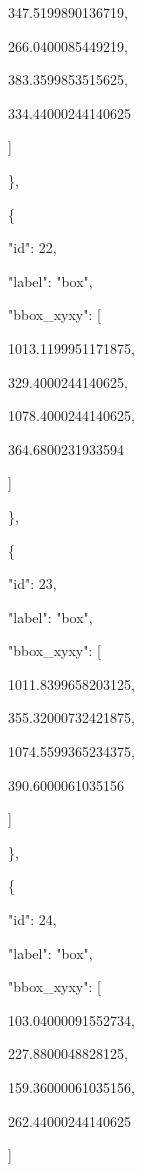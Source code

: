 \documentclass[10pt,a4paper]{article}
\begin{document}
        347.5199890136719,\allowbreak{}\par
        266.0400085449219,\allowbreak{}\par
        383.3599853515625,\allowbreak{}\par
        334.44000244140625\par
      ]\par
    \},\allowbreak{}\par
    \{\par
      "id":\allowbreak{} 22,\allowbreak{}\par
      "label":\allowbreak{} "box",\allowbreak{}\par
      "bbox\_xyxy":\allowbreak{} [\par
        1013.1199951171875,\allowbreak{}\par
        329.4000244140625,\allowbreak{}\par
        1078.4000244140625,\allowbreak{}\par
        364.6800231933594\par
      ]\par
    \},\allowbreak{}\par
    \{\par
      "id":\allowbreak{} 23,\allowbreak{}\par
      "label":\allowbreak{} "box",\allowbreak{}\par
      "bbox\_xyxy":\allowbreak{} [\par
        1011.8399658203125,\allowbreak{}\par
        355.32000732421875,\allowbreak{}\par
        1074.5599365234375,\allowbreak{}\par
        390.6000061035156\par
      ]\par
    \},\allowbreak{}\par
    \{\par
      "id":\allowbreak{} 24,\allowbreak{}\par
      "label":\allowbreak{} "box",\allowbreak{}\par
      "bbox\_xyxy":\allowbreak{} [\par
        103.04000091552734,\allowbreak{}\par
        227.8800048828125,\allowbreak{}\par
        159.36000061035156,\allowbreak{}\par
        262.44000244140625\par
      ]\par
\end{document}
